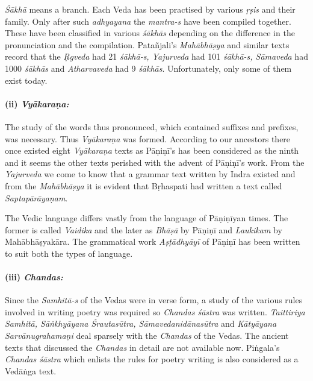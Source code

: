 \newpage

\textit{Śākhā} means a branch. Each Veda has been practised by various \textit{ṛṣis} and their family. Only after such \textit{adhyayana} the \textit{mantra-s} have been compiled together. These have been classified in various \textit{śākhās} depending on the difference in the pronunciation and the compilation. Patañjali’s \textit{Mahābhāṣya} and similar texts record that the \textit{Ṛgveda} had 21 \textit{śākhā-s, Yajurveda} had 101 \textit{śākhā-s, Sāmaveda} had 1000 \textit{śākhās} and \textit{Atharvaveda} had 9 \textit{śākhās}. Unfortunately, only some of them exist today.


\paragraph*{(ii) \textit{Vyākaraṇa:}}

\vskip -8pt

The study of the words thus pronounced, which contained suffixes and prefixes, was necessary. Thus \textit{Vyākaraṇa} was formed. According to our ancestors there once existed eight \textit{Vyākaraṇa} texts as Pāṇiṇī’s has been considered as the ninth and it seems the other texts perished with the advent of Pāṇiṇī’s work. From the \textit{Yajurveda} we come to know that a grammar text written by Indra existed and from the \textit{Mahābhāṣya} it is evident that Bṛhaspati had written a text called \textit{Saptapārāyaṇam}.

The Vedic language differs vastly from the language of Pāṇiṇīyan times. The former is called \textit{Vaidika} and the later as \textit{Bhāṣā} by Pāṇiṇī and \textit{Laukikam} by Mahābhāṣyakāra. The grammatical work \textit{Aṣṭādhyāyī} of Pāṇiṇī has been written to suit both the types of language.


\paragraph*{(iii) \textit{Chandas:}}

\vskip -8pt

Since the \textit{Samhitā-s} of the Vedas were in verse form, a study of the various rules involved in writing poetry was required so \textit{Chandas śāstra} was written. \textit{Taittiriya Samhitā, Sāṅkhyāyana Śrautasūtra, Sāmavedanidānasūtra} and \textit{Kātyāyana Sarvānugrahamaṇi} deal sparsely with the \textit{Chandas} of the Vedas. The ancient texts that discussed the \textit{Chandas} in detail are not available now. Piṅgala’s \textit{Chandas śāstra} which enlists the rules for poetry writing is also considered as a Vedāṅga text.



